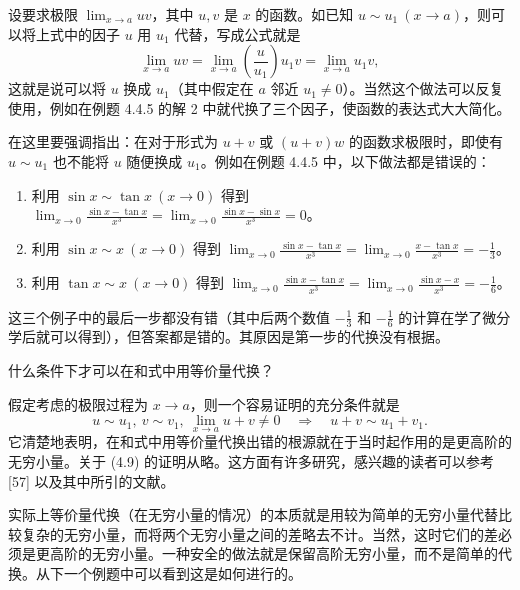 设要求极限 $\lim_{x\to a}uv$，其中 $u,v$ 是 $x$ 的函数。如已知 $u\sim u_1\ (x\to a)$，则可以将上式中的因子 $u$ 用 $u_1$ 代替，写成公式就是
\begin{equation}
  \lim_{x\to a}uv
  =\lim_{x\to a}\left(\frac u{u_1}\right)u_1v
  =\lim_{x\to a}u_1v,
  \tag{4.8}
  \label{eq:4.8}
\end{equation}
这就是说可以将 $u$ 换成 $u_1$（其中假定在 $a$ 邻近 $u_1\ne0$）。当然这个做法可以反复使用，例如在例题 4.4.5 的解 2 中就代换了三个因子，使函数的表达式大大简化。

在这里要强调指出：在对于形式为 $u+v$ 或 $(u+v)w$ 的函数求极限时，即使有 $u\sim u_1$ 也不能将 $u$ 随便换成 $u_1$。例如在例题 4.4.5 中，以下做法都是错误的：
\begin{enumerate}
  \item 利用 $\sin x\sim\tan x\ (x\to0)$ 得到 $\displaystyle\lim_{x\to0}\frac{\sin x-\tan x}{x^3}=\lim_{x\to0}\frac{\sin x-\sin x}{x^3}=0$。
  \item 利用 $\sin x\sim x\ (x\to0)$ 得到 $\displaystyle\lim_{x\to0}\frac{\sin x-\tan x}{x^3}=\lim_{x\to0}\frac{x-\tan x}{x^3}=-\frac13$。
  \item 利用 $\tan x\sim x\ (x\to0)$ 得到 $\displaystyle\lim_{x\to0}\frac{\sin x-\tan x}{x^3}=\lim_{x\to0}\frac{\sin x-x}{x^3}=-\frac16$。
\end{enumerate}
这三个例子中的最后一步都没有错（其中后两个数值 $-\frac13$ 和 $-\frac16$ 的计算在学了微分学后就可以得到），但答案都是错的。其原因是第一步的代换没有根据。

什么条件下才可以在和式中用等价量代换？

假定考虑的极限过程为 $x\to a$，则一个容易证明的充分条件就是
\begin{equation}
  u\sim u_1,\ v\sim v_1,\ \lim_{x\to a}u+v\ne0
  \quad\Longrightarrow\quad u+v\sim u_1+v_1.
  \tag{4.9}
  \label{eq:4.9}
\end{equation}
它清楚地表明，在和式中用等价量代换出错的根源就在于当时起作用的是更高阶的无穷小量。关于 (4.9) 的证明从略。这方面有许多研究，感兴趣的读者可以参考 [57] 以及其中所引的文献。

实际上等价量代换（在无穷小量的情况）的本质就是用较为简单的无穷小量代替比较复杂的无穷小量，而将两个无穷小量之间的差略去不计。当然，这时它们的差必须是更高阶的无穷小量。一种安全的做法就是保留高阶无穷小量，而不是简单的代换。从下一个例题中可以看到这是如何进行的。

